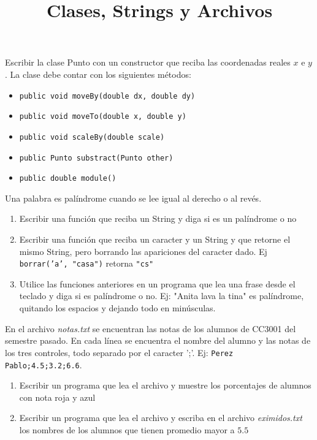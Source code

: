 \documentclass[dcc]{fcfmcourse}
\title[1]{Clases, Strings y Archivos}
\begin{document}
\maketitle

\begin{problems}
\problem Escribir la clase Punto con un constructor que reciba las coordenadas reales $x$ e $y$. La clase debe contar con los siguientes métodos:
\begin{itemize}
\item \texttt{public void moveBy(double dx, double dy)}
\item \texttt{public void moveTo(double x, double y)}
\item \texttt{public void scaleBy(double scale)}
\item \texttt{public Punto substract(Punto other)}
\item \texttt{public double module()}
\end{itemize}

\problem Una palabra es palíndrome cuando se lee igual al derecho o al revés.
\begin{enumerate}
\item Escribir una función que reciba un String y diga si es un palíndrome o no
\item Escribir una función que reciba un caracter y un String y que retorne el mismo String, pero borrando las apariciones del caracter dado. Ej \texttt{borrar('a', "casa")} retorna \texttt{"cs"}
\item Utilice las funciones anteriores en un programa que lea una frase desde el teclado y diga si es palíndrome o no. Ej: "Anita lava la tina" es palíndrome, quitando los espacios y dejando todo en minúsculas.
\end{enumerate}

\problem En el archivo \textit{notas.txt} se encuentran las notas de los alumnos de CC3001 del semestre pasado. En cada línea se encuentra el nombre del alumno y las notas de los tres controles, todo separado por el caracter ';'. Ej: \texttt{Perez Pablo;4.5;3.2;6.6}.
\begin{enumerate}
\item Escribir un programa que lea el archivo y muestre los porcentajes de alumnos con nota roja y azul
\item Escribir un programa que lea el archivo y escriba en el archivo \textit{eximidos.txt} los nombres de los alumnos que tienen promedio mayor a $5.5$
\end{enumerate}

\end{problems}
\end{document}
